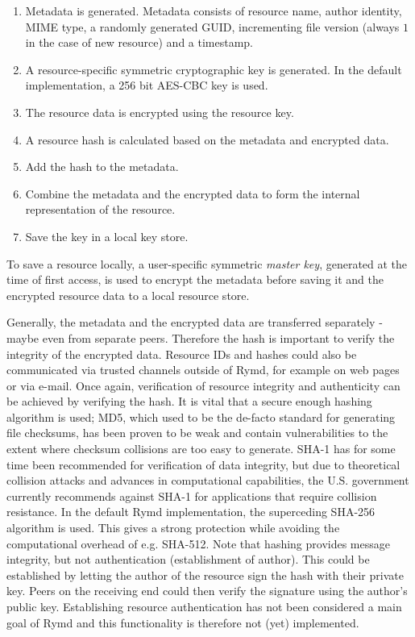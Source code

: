 
\begin{enumerate}
  \item Metadata is generated. Metadata consists of resource name, author identity, MIME type, a randomly generated GUID, incrementing file version (always $1$ in the case of new resource) and a timestamp.
  \item A resource-specific symmetric cryptographic key is generated. In the default implementation, a 256 bit AES-CBC key is used.
  \item The resource data is encrypted using the resource key.
  \item A resource hash is calculated based on the metadata and encrypted data.
  \item Add the hash to the metadata.
  \item Combine the metadata and the encrypted data to form the internal representation of the resource.
  \item Save the key in a local key store.
\end{enumerate}

To save a resource locally, a user-specific symmetric \emph{master key}, generated at the time of first access, is used to encrypt the metadata before saving it and the encrypted resource data to a local resource store.

Generally, the metadata and the encrypted data are transferred separately - maybe even from separate peers. Therefore the hash is important to verify the integrity of the encrypted data. Resource IDs and hashes could also be communicated via trusted channels outside of Rymd, for example on web pages or via e-mail. Once again, verification of resource integrity and authenticity can be achieved by verifying the hash. It is vital that a secure enough hashing algorithm is used; MD5, which used to be the de-facto standard for generating file checksums, has been proven to be weak and contain vulnerabilities to the extent where checksum collisions are too easy to generate. SHA-1 has for some time been recommended for verification of data integrity, but due to theoretical collision attacks and advances in computational capabilities, the U.S. government currently recommends against SHA-1 for applications that require collision resistance\cite{NIST:2012}. In the default Rymd implementation, the superceding SHA-256 algorithm is used. This gives a strong protection while avoiding the computational overhead of e.g. SHA-512. Note that hashing provides message integrity, but not authentication (establishment of author). This could be established by letting the author of the resource sign the hash with their private key. Peers on the receiving end could then verify the signature using the author's public key. Establishing resource authentication has not been considered a main goal of Rymd and this functionality is therefore not (yet) implemented.

